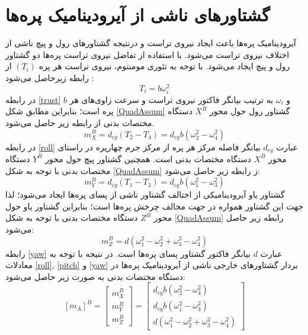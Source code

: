 \section{گشتاورهای ناشی از آيرودينامیک پره‌ها}
آیرودینامیک پره‌ها باعث ایجاد نیروی تراست و درنتیجه گشتاورهای رول و پیچ ناشی از اختلاف نیروی 
تراست می‌شود. با استفاده از تفاضل نیروی تراست پره‌ها دو گشتاور رول و پیچ ایجاد می‌شود. با توجه به تئوری مومنتوم، نیروی تراست هر پره 
$(T_i)$
از رابطه زیرحاصل می‌شود
\cite{Sharifi}
:
\begin{equation}\label{trust}
	T_i = b\omega_i^2
\end{equation}
در رابطه
\ref{trust}
$b$
و 
$\omega_i$
به ترتیب بیانگر فاکتور نیروی تراست و سرعت زاوی‌های هر پره است؛ بنابراین مطابق شکل 
\ref{QuadAssum}
گشتاور رول حول محور
$X^B$
دستگاه مختصات بدنی از رابطه زیر حاصل می‌شود.
\begin{equation}\label{roll}
	m_X^B = d_{cg}(T_2-T_4) = d_{cg}b(\omega_2^2-\omega_4^2)
\end{equation}
در رابطه 
\ref{roll}
عبارت 
$d_{cg}$
بیانگر فاصله مرکز هر پره از مرکز جرم چهارپره در راستای محور
$X^B$
دستگاه مختصات بدنی است. همچنین گشتاور پیچ حول محور 
$Y^B$
دستگاه مختصات بدنی با توجه به شكل
\ref{QuadAssum}
ز رابطه زیر حاصل می‌شود:
\begin{equation}\label{pitch}
	m_Y^B = d_{cg}(T_1-T_3) = d_{cg}b(\omega_1^2-\omega_3^2)
\end{equation}
گشتاور یاو آیرودینامیكی از اختالف گشتاور ناشی از پسای پره‌ها ایجاد می‌شود؛ لذا جهت این 
گشتاور همواره در جهت مخالف چرخش پره‌ها است؛ بنابراین گشتاور یاو حول محور
$Z^B$
دستگاه مختصات بدنی با توجه به شكل
\ref{QuadAssum}
رابطه زیر حاصل می‌شود:
\begin{equation}\label{yaw}
	m_Z^B = d(\omega_1^2-\omega_2^2+\omega_3^2-\omega_4^2)
\end{equation}
رابطه 
\ref{yaw}
عبارت 
$d$
بیانگر فاکتور گشتاور پسای پره‌ها است. در نتیجه با توجه به معادلات
\ref{roll},
\ref{pitch}
و
\ref{yaw}
بردار گشتاورهای خارجی ناشی از آیرودینامیک پره‌ها در دستگاه مختصات بدنی به صورت زیر حاصل می‌شود:
\begin{equation}\label{finaltorque}
	\left[m_A\right]^B = \begin{bmatrix}
		m_X^B\\m_Y^B\\m_Z^B
	\end{bmatrix}
 =  \begin{bmatrix}
 	d_{cg}b(\omega_2^2-\omega_4^2)\\
 	d_{cg}b(\omega_1^2-\omega_3^2)\\
 	d(\omega_1^2-\omega_2^2+\omega_3^2-\omega_4^2)
 \end{bmatrix}
\end{equation}